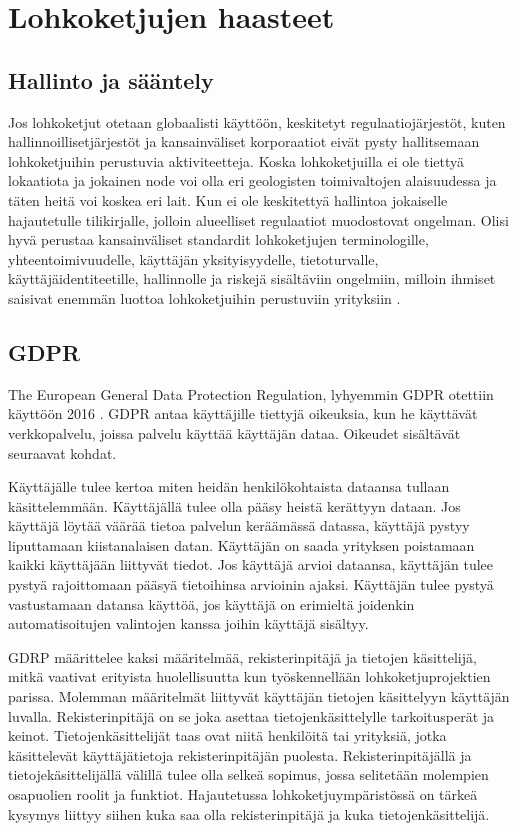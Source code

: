 \documentclass[utf8,bachelor]{gradu3}
\providecommand{\DIFaddend}{} %
\DeclareRobustCommand{\DIFaddend}{\DIFOaddend \let\includegraphics\DIFOincludegraphics} %
\begin{document}
\DIFaddend \chapter{Lohkoketjujen haasteet}\label{Haasteet}

\section{Hallinto ja sääntely}
Jos lohkoketjut otetaan globaalisti käyttöön, keskitetyt regulaatiojärjestöt, kuten hallinnoillisetjärjestöt ja kansainväliset korporaatiot eivät pysty hallitsemaan lohkoketjuihin perustuvia aktiviteetteja. \parencite{wright2015decentralized}
Koska lohkoketjuilla ei ole tiettyä lokaatiota ja jokainen node voi olla eri geologisten toimivaltojen alaisuudessa ja täten heitä voi koskea eri lait. 
Kun ei ole keskitettyä hallintoa jokaiselle hajautetulle tilikirjalle, jolloin alueelliset regulaatiot muodostovat ongelman. \parencite{cermeno2016blockchain}
Olisi hyvä perustaa kansainväliset standardit lohkoketjujen terminologille, yhteentoimivuudelle, käyttäjän yksityisyydelle, tietoturvalle, käyttäjäidentiteetille, hallinnolle ja riskejä sisältäviin ongelmiin, milloin ihmiset saisivat enemmän luottoa lohkoketjuihin perustuviin yrityksiin \parencite{ali2019blockchain}.

\section{GDPR}

The European General Data Protection Regulation, lyhyemmin GDPR otettiin käyttöön 2016 \parencite{GDPR}.
GDPR antaa käyttäjille tiettyjä oikeuksia, kun he käyttävät verkkopalvelu, joissa palvelu käyttää käyttäjän dataa. Oikeudet sisältävät seuraavat kohdat.

Käyttäjälle tulee kertoa miten heidän henkilökohtaista dataansa tullaan käsittelemmään.
Käyttäjällä tulee olla pääsy heistä kerättyyn dataan.
Jos käyttäjä löytää väärää tietoa palvelun keräämässä datassa, käyttäjä pystyy liputtamaan kiistanalaisen datan.
Käyttäjän on saada yrityksen poistamaan kaikki käyttäjään liittyvät tiedot.
Jos käyttäjä arvioi dataansa, käyttäjän tulee pystyä rajoittomaan pääsyä tietoihinsa  arvioinin ajaksi.
Käyttäjän tulee pystyä vastustamaan datansa käyttöä, jos käyttäjä on erimieltä joidenkin automatisoitujen valintojen kanssa joihin käyttäjä sisältyy.

GDRP määrittelee kaksi määritelmää, rekisterinpitäjä ja tietojen käsittelijä, mitkä vaativat erityista huolellisuutta kun työskennellään lohkoketjuprojektien parissa. Molemman määritelmät liittyvät käyttäjän tietojen käsittelyyn käyttäjän luvalla.
Rekisterinpitäjä on se joka asettaa tietojenkäsittelylle tarkoitusperät ja keinot. Tietojenkäsittelijät taas ovat niitä henkilöitä tai yrityksiä, jotka käsittelevät käyttäjätietoja rekisterinpitäjän puolesta. Rekisterinpitäjällä ja tietojekäsittelijällä välillä tulee olla selkeä sopimus, jossa selitetään molempien osapuolien roolit ja funktiot.
Hajautetussa lohkoketjuympäristössä on tärkeä kysymys liittyy siihen kuka saa olla rekisterinpitäjä ja kuka tietojenkäsittelijä.
\end{document}
